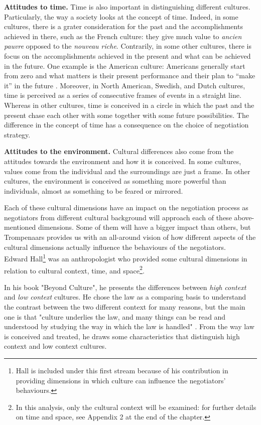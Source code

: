 \documentclass[../main.tex]{subfiles}
\begin{document}
\textbf{Attitudes to time.} Time is also important in distinguishing different cultures. Particularly, the way a society looks at the concept of time. Indeed, in some cultures, there is a grater consideration for the past and the accomplishments achieved in there, such as the French culture: they give much value to \textit{ancien pauvre} opposed to the \textit{nouveau riche}. Contrarily, in some other cultures, there is focus on the accomplishments achieved in the present and what can be achieved in the future. One example is the American culture: Americans generally start from zero and what matters is their present performance and their plan to “make it” in the future \mancite\autocite[10]{trompenaars}. Moreover, in North American, Swedish, and Dutch cultures, time is perceived as a series of consecutive frames of events in a straight line. Whereas in other cultures, time is conceived in a circle in which the past and the present chase each other with some together with some future possibilities. The difference in the concept of time has a consequence on the choice of negotiation strategy. 

\textbf{Attitudes to the environment.} Cultural differences also come from the attitudes towards the environment and how it is conceived. In some cultures, values come from the individual and the surroundings are just a frame. In other cultures, the environment is conceived as something more powerful than individuals, almost as something to be feared or mirrored.

Each of these cultural dimensions have an impact on the negotiation process as negotiators from different cultural background will approach each of these above-mentioned dimensions. Some of them will have a bigger impact than others, but Trompenaars provides us with an all-around vision of how different aspects of the cultural dimensions actually influence the behaviours of the negotiators.\\

Edward Hall\footnote{Hall is included under this first stream because of his contribution in providing dimensions in which culture can influence the negotiators' behaviours.} was an anthropologist who provided some cultural dimensions in relation to cultural context, time, and space\footnote{In this analysis, only the cultural context will be examined: for further details on time and space, see Appendix 2 at the end of the chapter.}. 

In his book "Beyond Culture", he presents the differences between \textit{high context} and \textit{low context} cultures. He chose the law as a comparing basis to understand the contrast between the two different context for many reasons, but the main one is that "culture underlies the law, and many things can be read and understood by studying the way in which the law is handled" \autocite[107]{hall1}. From the way law is conceived and treated, he draws some characteristics that distinguish high context and low context cultures.
\end{document}

